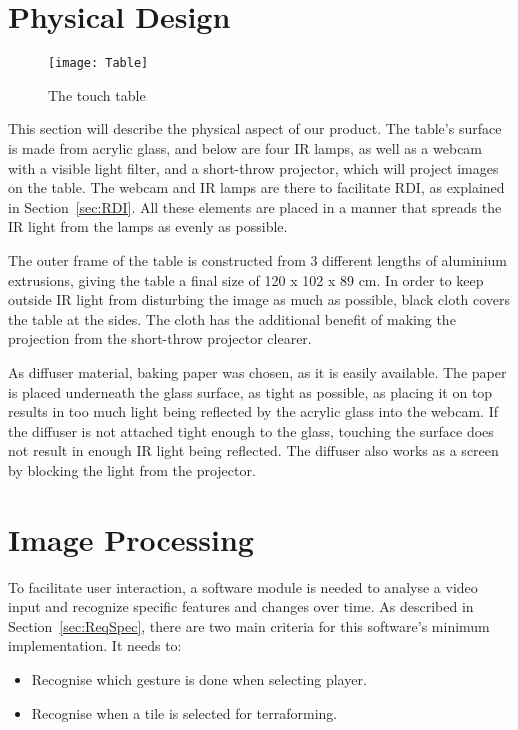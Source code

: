 \section{Physical Design} 
\begin{figure} [!h]
\centering \texttt{[image: Table]}
 \caption{The touch table \label{Fig:Table}}
\end{figure}
This section will describe the physical aspect of our product.
The table's surface is made from acrylic glass, and below are four IR lamps, as well as a webcam with a visible light filter, and a short-throw projector, which will project images on the table. The webcam and IR lamps are there to facilitate RDI, as explained in Section~\ref{sec:RDI}. All these elements are placed in a manner that spreads the IR light from the lamps as evenly as possible.

The outer frame of the table is constructed from 3 different lengths of aluminium extrusions, giving the table a final size of 120 x 102 x 89 cm.
In order to keep outside IR light from disturbing the image as much as possible, black cloth covers the table at the sides. The cloth has the additional benefit of making the projection from the short-throw projector clearer. 

As diffuser material, baking paper was chosen, as it is easily available. The paper is placed underneath the glass surface, as tight as possible, as placing it on top results in too much light being reflected by the acrylic glass into the webcam. If the diffuser is not attached tight enough to the glass, touching the surface does not result in enough IR light being reflected. The diffuser also works as a screen by blocking the light from the projector. 

\section{Image Processing}
To facilitate user interaction, a software module is needed to analyse a video input and recognize specific features and changes over time. As described in Section~\ref{sec:ReqSpec}, there are two main criteria for this software's minimum implementation. It needs to:
\begin{itemize}
\item Recognise which gesture is done when selecting player.
\item Recognise when a tile is selected for terraforming.
\end{itemize}

